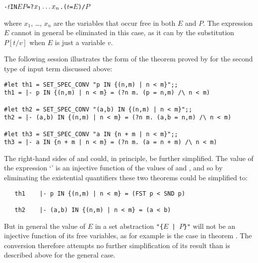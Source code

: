 \begin{hol}\def\m#1{\mbox{\small$#1$}}
\begin{alltt}
   {\vb}- \m{t} IN \lb\m{E} \vb \m{P}\rb = ?\m{x\sb{1}\dots x\sb{n}}. (\m{t} = \m{E}) /\bk \m{P}
\end{alltt}\end{hol}

\noindent where $x_1$, \dots, $x_n$ are the variables that occur free in both
$E$ and $P$. The expression $E$ cannot in general be eliminated in this case,
as it can by the substitution $P[t/v]$ when $E$ is just a variable $v$.

\pagebreak[3]

The following session illustrates the form of the theorem proved by
 for the second type of input term discussed above:

\setcounter{sessioncount}{1}
\begin{session}
\begin{verbatim}
#let th1 = SET_SPEC_CONV "p IN {(n,m) | n < m}";;
th1 = |- p IN {(n,m) | n < m} = (?n m. (p = n,m) /\ n < m)

#let th2 = SET_SPEC_CONV "(a,b) IN {(n,m) | n < m}";;
th2 = |- (a,b) IN {(n,m) | n < m} = (?n m. (a,b = n,m) /\ n < m)

#let th3 = SET_SPEC_CONV "a IN {n + m | n < m}";;
th3 = |- a IN {n + m | n < m} = (?n m. (a = n + m) /\ n < m)
\end{verbatim}\end{session}

\noindent The right-hand sides of  and  could, in principle, be
further simplified.  The value of the expression `' is an injective
function of the values of  and , and so by eliminating the
existential quantifiers these two theorems could be simplified to:

\begin{hol}
\begin{verbatim}
   th1    |- p IN {(n,m) | n < m} = (FST p < SND p)

   th2    |- (a,b) IN {(n,m) | n < m} = (a < b)
\end{verbatim}\end{hol}

\noindent But in general the value of {\small $E$} in a set abstraction
{\small\verb!"{!$E$\verb! | !$P$\verb!}"!} will not be an injective function of
its free variables, as for example is the case in theorem .  The
conversion  therefore attempts no further simplification of
its result than is described above for the general
case.%


